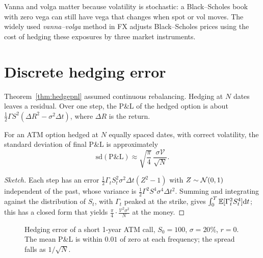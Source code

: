 Vanna and volga matter because volatility is stochastic: a Black--Scholes book with zero vega can still have vega that changes when spot or vol moves. The widely used \emph{vanna--volga} method in FX adjusts Black--Scholes prices using the cost of hedging these exposures by three market instruments.

\section{Discrete hedging error}

Theorem~\ref{thm:hedgepnl} assumed continuous rebalancing. Hedging at $N$ dates leaves a residual. Over one step, the P\&L of the hedged option is about $\tfrac12\Gamma S^2(\Delta R^2-\sigma^2\Delta t)$, where $\Delta R$ is the return.

\begin{theorem}\label{thm:derman}
For an ATM option hedged at $N$ equally spaced dates, with correct volatility, the standard deviation of final P\&L is approximately
\[
\mathrm{sd}(\text{P\&L})\approx\sqrt{\frac\pi4}\,\frac{\sigma\mathcal{V}}{\sqrt N}.
\]
\end{theorem}
\begin{proof}[Sketch]
Each step has an error $\tfrac12\Gamma_tS_t^2\sigma^2\Delta t(Z^2-1)$ with $Z\sim\mathcal{N}(0,1)$ independent of the past, whose variance is $\tfrac12\Gamma^2S^4\sigma^4\Delta t^2$. Summing and integrating against the distribution of $S_t$, with $\Gamma_t$ peaked at the strike, gives $\int_0^T\mathbb{E}[\Gamma_t^2S_t^4]\mathrm{d} t$; this has a closed form that yields $\tfrac{\pi}{4}\cdot\frac{\mathcal{V}^2\sigma^2}{N}$ at the money.
\end{proof}

\begin{figure}[t]
\centering
{}
\caption{Hedging error of a short 1-year ATM call, $S_0=100$, $\sigma=20\%$, $r=0$. The mean P\&L is within $0.01$ of zero at each frequency; the spread falls as $1/\sqrt N$.}\label{fig:hedge}
\end{figure}

